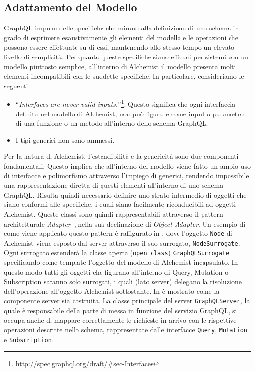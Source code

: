 \subsection{Adattamento del Modello}\label{ssec:model-adaptation}
GraphQL impone delle specifiche che mirano alla definizione di uno schema in grado di esprimere
esaustivamente gli elementi del modello e le operazioni che possono essere effettuate su di essi, mantenendo allo stesso tempo un elevato livello di semplicità.
Per quanto queste specifiche siano efficaci per sistemi con un modello piuttosto semplice, all'interno di Alchemist il modello presenta molti elementi incompatibili
con le suddette specifiche. In particolare, consideriamo le seguenti:
\begin{itemize}
    \item ``\textit{Interfaces are never valid inputs.}''\footnote{http://spec.graphql.org/draft/\#sec-Interfaces}. Questo significa che ogni interfaccia
        definita nel modello di Alchemist, non può figurare come input o parametro di una funzione o un metodo all'interno dello schema GraphQL.
    \item I tipi generici non sono ammessi.
\end{itemize}
Per la natura di Alchemist, l'estendibilità e la genericità sono due componenti fondamentali. Questo implica che all'interno del modello viene fatto un
ampio uso di interfacce e polimorfismo attraverso l'impiego di generici, rendendo impossibile una rappresentazione diretta di questi elementi all'interno
di uno schema GraphQL.
Risulta quindi necessario definire uno strato intermedio di oggetti che siano conformi alle specifiche, i quali siano facilmente riconducibili ad oggetti
Alchemist. Queste classi sono quindi rappresentabili attraverso il pattern architetturale \textit{Adapter}~\cite{design-patterns}, nella sua declinazione
di \textit{Object Adapter}. Un esempio di come viene applicato questo pattern è raffigurato in , dove l'oggetto \texttt{Node} di Alchemist
viene esposto dal server attraverso il suo surrogato, \texttt{NodeSurrogate}.
%
%
Ogni surrogato estenderà la classe aperta (\texttt{open class}) \texttt{GraphQLSurrogate}, specificando come template l'oggetto del modello di Alchemist
incapsulato.
%
In questo modo tutti gli oggetti che figurano all'interno di Query, Mutation o Subscription saranno solo surrogati, i quali (lato server) delegano la
risoluzione dell'operazione all'oggetto Alchemist sottostante.
In  è mostrato come la componente server sia costruita. La classe principale del server \texttt{GraphQLServer}, la quale è responsabile della parte
di messa in funzione del servizio GraphQL, si occupa anche di mappare correttamente le richieste in arrivo con le rispettive operazioni 
descritte nello schema, rappresentate dalle interfacce \texttt{Query}, \texttt{Mutation} e \texttt{Subscription}.


